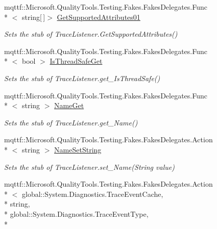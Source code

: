 \begin{DoxyCompactItemize}
mqttf\-::\-Microsoft.\-Quality\-Tools.\-Testing.\-Fakes.\-Fakes\-Delegates.\-Func\\*
$<$ string\mbox{[}$\,$\mbox{]}$>$ \hyperlink{class_system_1_1_diagnostics_1_1_fakes_1_1_stub_console_trace_listener_a5f46e56335785ab10791fc54d943d7ed}{Get\-Supported\-Attributes01}
\begin{DoxyCompactList}\small\item\em Sets the stub of Trace\-Listener.\-Get\-Supported\-Attributes()\end{DoxyCompactList}\item 
mqttf\-::\-Microsoft.\-Quality\-Tools.\-Testing.\-Fakes.\-Fakes\-Delegates.\-Func\\*
$<$ bool $>$ \hyperlink{class_system_1_1_diagnostics_1_1_fakes_1_1_stub_console_trace_listener_a21ba4bb53a9db25517d42ddc7dcceaf3}{Is\-Thread\-Safe\-Get}
\begin{DoxyCompactList}\small\item\em Sets the stub of Trace\-Listener.\-get\-\_\-\-Is\-Thread\-Safe()\end{DoxyCompactList}\item 
mqttf\-::\-Microsoft.\-Quality\-Tools.\-Testing.\-Fakes.\-Fakes\-Delegates.\-Func\\*
$<$ string $>$ \hyperlink{class_system_1_1_diagnostics_1_1_fakes_1_1_stub_console_trace_listener_ac01b64cbc687f9514fe9d82c1c0fe08b}{Name\-Get}
\begin{DoxyCompactList}\small\item\em Sets the stub of Trace\-Listener.\-get\-\_\-\-Name()\end{DoxyCompactList}\item 
mqttf\-::\-Microsoft.\-Quality\-Tools.\-Testing.\-Fakes.\-Fakes\-Delegates.\-Action\\*
$<$ string $>$ \hyperlink{class_system_1_1_diagnostics_1_1_fakes_1_1_stub_console_trace_listener_a62bf6ae5352643769b8de6afd77f0f4d}{Name\-Set\-String}
\begin{DoxyCompactList}\small\item\em Sets the stub of Trace\-Listener.\-set\-\_\-\-Name(\-String value)\end{DoxyCompactList}\item 
mqttf\-::\-Microsoft.\-Quality\-Tools.\-Testing.\-Fakes.\-Fakes\-Delegates.\-Action\\*
$<$ global\-::\-System.\-Diagnostics.\-Trace\-Event\-Cache, \\*
string, \\*
global\-::\-System.\-Diagnostics.\-Trace\-Event\-Type, \\*

\end{DoxyCompactItemize}
